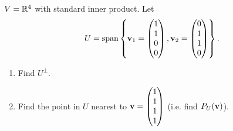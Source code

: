 \documentclass[10pt, a4paper]{article}
\begin{document}
\begin{example}
    $V = \mathbb{R} ^ 4$ with standard inner product.
    Let
    \[
    U = \mathrm{span}\left\{\mathbf{v}_1 = \begin{pmatrix}
        1 \\ 1 \\ 0 \\ 0
    \end{pmatrix}, \mathbf{v}_2 = \begin{pmatrix}
        0 \\ 1 \\ 1 \\ 0
    \end{pmatrix}\right\}.
    \]
    \begin{enumerate}[label = (\alph*)]
        \item Find $U ^ {\perp}$.

        \item Find the point in $U$ nearest to $\mathbf{v} = \begin{pmatrix}
            1 \\ 1 \\ 1 \\ 1
        \end{pmatrix}$
        (i.e. find $P_{U}(\mathbf{v})$).
    \end{enumerate}


\end{example}
\end{document}
